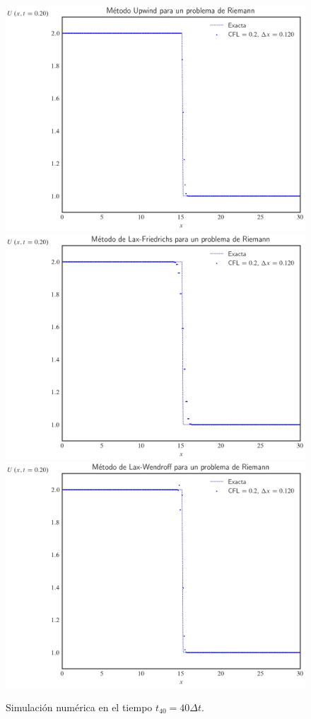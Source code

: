 \begin{figure}[ht!]
    \centering
    \includegraphics[width=.30\paperwidth]{../snapshots/upwindheaviside1d-10.png}
    \includegraphics[width=.30\paperwidth]{../snapshots/lax-friedrichsheaviside1d-10.png}
    \includegraphics[width=.30\paperwidth]{../snapshots/lax-wendroffheaviside1d-10.png}
    \caption{Simulación numérica en el tiempo $t_{40}=40\Delta t$.}
    \label{fig:example2t10}
\end{figure}

